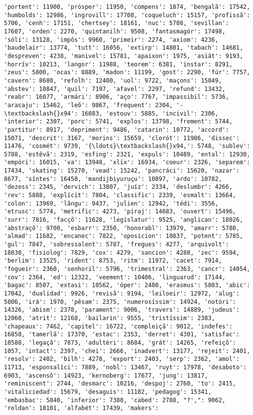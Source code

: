 \begin{Verbatim}[commandchars=\\\{\}]
'portent': 11900, 'prósper': 11950, 'compens': 1874, 'bengalã': 17542, 'humbolds': 12986, 'ingrovill': 17708, 'coqueluch': 15157, 'profissã': 5706, 'cenh': 17151, 'chertsey': 18161, 'nuc': 5708, 'sevillan': 17607, 'orden': 2270, 'quintanilh': 9508, 'fantasmagór': 17498, 'sóli': 13128, 'impôs': 9960, 'primeir': 2274, 'axiom': 4236, 'baudelair': 13774, 'tutt': 16056, 'extirp': 14801, 'tabach': 14681, 'despreven': 4238, 'manivel': 15781, 'apaixon': 1975, 'asiát': 9193, 'horrív': 10213, 'langor': 11988, 'teorem': 6381, 'instar': 8291, 'zeus': 5800, 'ocas': 8889, 'madon': 11199, 'gost': 2290, 'fúr': 7757, 'cavern': 8680, 'refolh': 12400, 'uol': 9722, 'maçons': 15049, 'abstev': 10847, 'quil': 7197, 'afavel': 2297, 'refund': 13432, 'reabr': 16077, 'armári': 8906, 'aço': 7767, 'impassibil': 5736, 'aracaju': 15462, 'leõ': 9867, 'frequent': 2304, '-\textbackslash{}x94': 16083, 'estouv': 5885, 'incivil': 2306, 'interior': 2307, 'porc': 5741, 'explos': 13798, 'frement': 5744, 'partitur': 8917, 'depriment': 9486, 'catarin': 10772, 'accord': 15071, 'descrit': 3167, 'morins': 15659, 'clorót': 11986, 'dissec': 11476, 'cosmét': 9739, '{\ldots}\textbackslash{}x94,': 5748, 'sublev': 5788, 'estêvã': 2319, 'esfing': 2321, 'expuls': 10489, 'ental': 12930, 'empóri': 16015, 'va': 13948, 'xlix': 16934, 'coeur': 2326, 'separem': 17434, 'skating': 15270, 'vead': 15242, 'pancráci': 15620, 'nazar': 8677, 'síntes': 16458, 'mandijbiyuruçu': 10897, 'ardo': 10782, 'dezess': 2345, 'dervich': 13807, 'juíz': 2334, 'deslumbr': 4266, 'rev': 5888, 'explícit': 7804, 'classific': 2339, 'esmalt': 13664, 'colon': 13969, 'lângu': 9437, 'julien': 12942, 'tédi': 3556, 'etrusc': 5774, 'metrific': 4273, 'piraj': 14683, 'ouvert': 15496, 'surr': 7816, 'facçõ': 11628, 'legislatur': 9525, 'anglican': 18026, 'abstraçõ': 9700, 'esbarr': 2350, 'honorabl': 13979, 'amarr': 5780, 'almad': 11682, 'encanec': 7822, 'oposicion': 10837, 'potent': 5785, 'gul': 7847, 'sobressalent': 5787, 'fregues': 4277, 'arquivolt': 18030, 'fisiolog': 7829, 'cox': 4279, 'sancion': 4280, 'zec': 9594, 'berlim': 13525, 'rident': 8753, 'ritm': 11972, 'cacet': 7914, 'fogueir': 2360, 'senhoril': 5796, 'trimestral': 2363, 'cancr': 14054, 'cov': 2364, 'ed': 12322, 'veement': 10406, 'linguarud': 17144, 'bagac': 8507, 'extasi': 10562, 'óper': 2480, 'erasmus': 5803, 'abic': 17042, 'dualidad': 9926, 'revisã': 9194, 'leiloeir': 12972, 'alug': 5806, 'irá': 1970, 'pêsam': 2375, 'numerosíssim': 14924, 'notóri': 14326, 'abism': 2378, 'parament': 9006, 'travers': 14889, 'judeus': 12060, 'atrit': 12168, 'bailarin': 9555, 'tristíssim': 2383, 'chapeaux': 7462, 'capitel': 16722, 'compleiçã': 9012, 'indefes': 16850, 'tamerlã': 17370, 'estac': 2353, 'derret': 4301, 'satisfac': 10588, 'legaçã': 7873, 'adultéri': 8684, 'grát': 14265, 'refeiçõ': 1057, 'intact': 2397, 'chei': 2666, 'inadvert': 13177, 'rejeit': 2401, 'resolv': 2402, 'bilh': 4278, 'export': 2403, 'serp': 2362, 'amol': 11713, 'esponsalíci': 7889, 'nobl': 13467, 'ruyt': 17978, 'desaboto': 6903, 'ascensõ': 14923, 'kernoberg': 17677, 'jung': 13817, 'reminiscent': 2744, 'desmarc': 10216, 'despoj': 2760, 'to': 2415, 'vitaliciedad': 15679, 'desaguis': 11182, 'pedagog': 15341, 'embasbac': 5840, 'inferior': 7380, 'cabed': 2788, "?',": 9062, 'roldan': 18101, 'alfabét': 17439, 'makers': 
\end{Verbatim}
